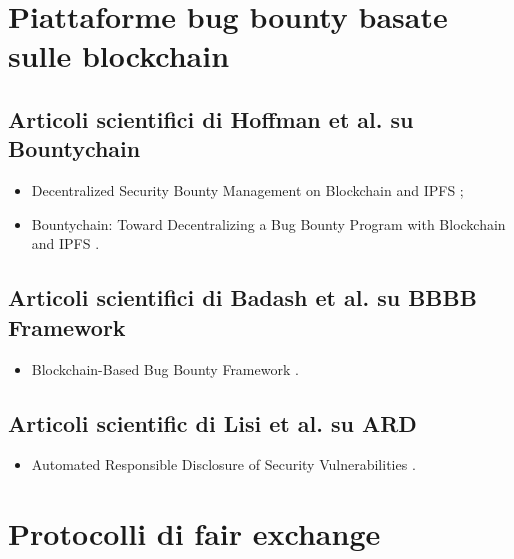 \section*{Piattaforme bug bounty basate sulle blockchain}

\subsection*{Articoli scientifici di Hoffman et al. su Bountychain}
\begin{itemize}

\item Decentralized Security Bounty Management on Blockchain and IPFS \cite{hoffman2020bountychain};

\item Bountychain: Toward Decentralizing a Bug Bounty Program with Blockchain and IPFS \cite{hoffman2021bountychain}.

\end{itemize}

\subsection*{Articoli scientifici di Badash et al. su BBBB Framework}
\begin{itemize}

\item Blockchain-Based Bug Bounty Framework \cite{badash2021blockbounty}.

\end{itemize}

\subsection*{Articoli scientific di Lisi et al. su ARD}
\begin{itemize}

\item Automated Responsible Disclosure of Security Vulnerabilities \cite{lisi2022ard}.

\end{itemize}

\section*{Protocolli di fair exchange}

